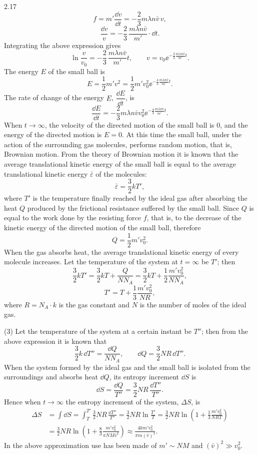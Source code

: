 \begin{solution}{2.17}
\[
f=m'\frac{\dd v}{\dd t}=-\frac{2}{3}m\lambda n\bar{v}\,v,
\]
\[
\frac{\dd v}{v}=-\frac{2}{3}\,\frac{m\lambda n\bar{v}}{m'}\cdot\dd t.
\]
Integrating the above expression gives
\[
\ln\frac{v}{v_0}=-\frac{2}{3}\,\frac{m\lambda n\bar{v}}{m'}t,
\qquad
v=v_0\ee^{-\frac{2}{3}\frac{m\lambda n\bar{v}}{m'}t}.
\]
The energy $E$ of the small ball is
\[
E=\frac{1}{2}m'v^2=\frac{1}{2}m'v_0^2\ee^{-\frac{4}{3}\frac{m\lambda n\bar{v}}{m'}t}.
\]
The rate of change of the energy $E$, $\dfrac{\dd E}{\dd t}$, is
\[
\frac{\dd E}{\dd t}=-\frac{2}{3}m\lambda n\bar{v}v_0^2\ee^{-\frac{4}{3}\frac{m\lambda n\bar{v}}{m'}t}.
\]
When $t\to\infty$, the velocity of the directed motion of the small ball is 0, and the energy of the directed motion is $E=0$. At this time the small ball, under the action of the surrounding gas molecules, performs random motion, that is, Brownian motion. From the theory of Brownian motion it is known that the average translational kinetic energy of the small ball is equal to the average translational kinetic energy $\bar{\varepsilon}$ of the molecules:
\[
\bar{\varepsilon}=\frac{3}{2}kT',
\]
where $T'$ is the temperature finally reached by the ideal gas after absorbing the heat $Q$ produced by the frictional resistance suffered by the small ball. Since $Q$ is equal to the work done by the resisting force $f$, that is, to the decrease of the kinetic energy of the directed motion of the small ball, therefore
\[
Q=\frac{1}{2}m'v_0^2.
\]
When the gas absorbs heat, the average translational kinetic energy of every molecule increases. Let the temperature of the system at $t=\infty$ be $T'$; then
\[
\frac{3}{2}kT'=\frac{3}{2}kT+\frac{Q}{NN_A}=\frac{3}{2}kT+\frac{1}{2}\frac{m'v_0^2}{NN_A},
\]
\[
T'=T+\frac{1}{3}\frac{m'v_0^2}{NR},
\]
where $R=N_A\cdot k$ is the gas constant and $N$ is the number of moles of the ideal gas.

(3) Let the temperature of the system at a certain instant be $T''$; then from the above expression it is known that
\[
\frac{3}{2}k\,\dd T''=\frac{\dd Q}{NN_A},\qquad \dd Q=\frac{3}{2}NR\,\dd T''.
\]
When the system formed by the ideal gas and the small ball is isolated from the surroundings and absorbs heat $\dd Q$, its entropy increment $\dd S$ is
\[
\dd S=\frac{\dd Q}{T''}=\frac{3}{2}NR\,\frac{\dd T''}{T''}.
\]
Hence when $t\to\infty$ the entropy increment of the system, $\Delta S$, is
\[
\begin{aligned}
\Delta S&=\int \dd S=\int_T^{T'}\frac{3}{2}NR\,\frac{\dd T''}{T''}
=\frac{3}{2}NR\ln\frac{T'}{T}=\frac{3}{2}NR\ln\left(1+\frac{1}{3}\frac{m'v_0^2}{NRT}\right)\\[2pt]
&=\frac{3}{2}NR\ln\left(1+\frac{8}{3}\frac{m'v_0^2}{\pi NM\bar{v}^2}\right)\approx\frac{4km'v_0^2}{\pi m(\bar{v})^2}.
\end{aligned}
\]
In the above approximation use has been made of $m'\sim NM$ and $(\bar{v})^2\gg v_0^2$.


\end{solution}
